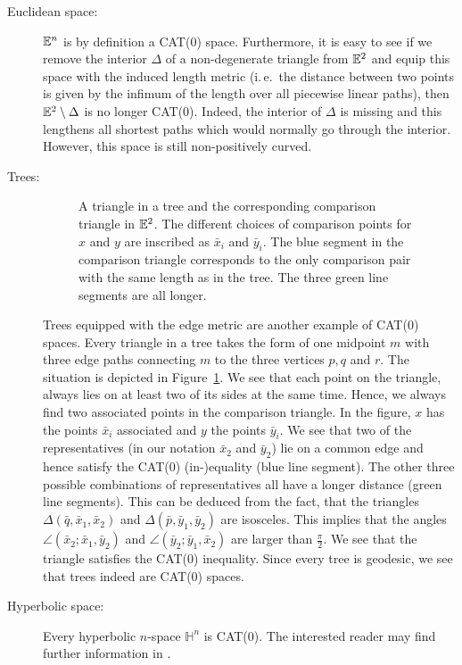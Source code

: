 \begin{bsp}
  \begin{description}
  \item[Euclidean space:] \(\mathbb{E}^n\) is by definition a CAT(0) space. Furthermore, it is easy to see if we remove the interior \(\Delta\) of a non-degenerate triangle from \(\mathbb{E}^2\) and equip this space with the induced length metric (i.\,e.\ the distance between two points is given by the infimum of the length over all piecewise linear paths), then \(\mathbb{E}^2 \setminus \Delta\) is no longer CAT(0). Indeed, the interior of \(\Delta\) is missing and this lengthens all shortest paths which would normally go through the interior. However, this space is still non-positively curved.
  \item[Trees:]
    \begin{figure}[htbp]
      \centering
      
      \caption{A triangle in a tree and the corresponding comparison triangle in \(\mathbb{E}^2\). The different choices of comparison points for \(x\) and \(y\) are inscribed as \(\bar x_i\) and \(\bar y_i\). The blue segment in the comparison triangle corresponds to the only comparison pair with the same length as in the tree. The three green line segments are all longer.}
      \label{fig:cat-tree}
    \end{figure}
    Trees equipped with the edge metric are another example of CAT(0) spaces. Every triangle in a tree takes the form of one midpoint \(m\) with three edge paths connecting \(m\) to the three vertices \(p,q\) and \(r\). The situation is depicted in Figure~\ref{fig:cat-tree}. We see that each point on the triangle, always lies on at least two of its sides at the same time. Hence, we always find two associated points in the comparison triangle. In the figure, \(x\) has the points \(\bar x_i\) associated and \(y\) the points \(\bar y_i\). We see that two of the representatives (in our notation \(\bar x_2\) and \(\bar y_2\)) lie on a common edge and hence satisfy the CAT(0) (in-)equality (blue line segment). The other three possible combinations of representatives all have a longer distance (green line segments). This can be deduced from the fact, that the triangles \(\Delta(\bar q, \bar x_1, \bar x_2)\) and \(\Delta(\bar p, \bar y_1, \bar y_2)\) are isosceles. This implies that the angles \(\angle(\bar x_2; \bar x_1, \bar y_2)\) and \(\angle(\bar y_2; \bar y_1, \bar x_2)\) are larger than \(\frac{\pi}{2}\). We see that the triangle satisfies the CAT(0) inequality. Since every tree is geodesic, we see that trees indeed are CAT(0) spaces.
  \item[Hyperbolic space:] Every hyperbolic \(n\)-space \(\mathbb{H}^n\) is CAT(0). The interested reader may find further information in \textcite[Section~II.1]{MR1744486}.
  \end{description}
\end{bsp}


